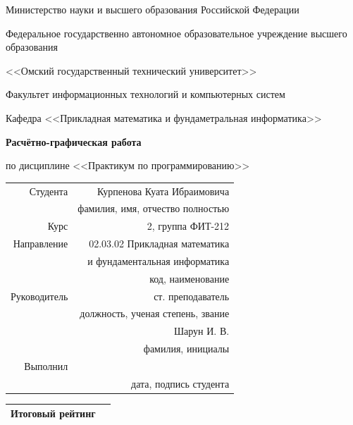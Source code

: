 \documentclass[14pt, a4paper]{article}
\begin{document}
    \pagestyle{empty}

    \begin{center}
        Министерство науки и высшего образования Российской Федерации

        Федеральное государственно автономное образовательное учреждение высшего образования

        <<Омский государственный технический университет>>

        \vspace{1cm}
        Факультет информационных технологий и компьютерных систем

        Кафедра <<Прикладная математика и фундаметральная информатика>>

        \vspace{3cm}
        \textbf{Расчётно-графическая работа}

        по дисциплине <<Практикум по программированию>>
    \end{center}
    
    \vspace{3cm}
    \begin{flushright}    
        \begin{tabular}{ r r }
            Студента & Курпенова Куата Ибраимовича \\
            \cline{2-2}
            & \tiny{фамилия, имя, отчество полностью} \\

            Курс & 2, группа ФИТ-212 \\
            \cline{2-2}
            Направление & 02.03.02 Прикладная математика \\
            \cline{2-2}
            & и фундаментальная информатика \\
            \cline{2-2}
            & \tiny{код, наименование} \\
            
            Руководитель & ст. преподаватель \\
            \cline{2-2}
            & \tiny{должность, ученая степень, звание} \\
            & Шарун И. В. \\
            \cline{2-2}
            & \tiny{фамилия, инициалы} \\
            
            Выполнил & \\
            \cline{2-2}
            & \tiny{дата, подпись студента} \\
        \end{tabular}

        \vspace{1cm}

        \begin{tabular}{ | c | c | }
            \hline
            Итоговый рейтинг & \\
            \hline
        \end{tabular}
    \end{flushright}
    
\end{document}
